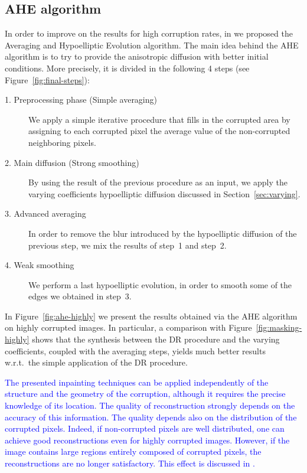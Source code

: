 \documentclass[proc]{edpsmath}
\begin{document}
\subsection{AHE algorithm}

In order to improve on the results for high corruption rates, in \cite{ahe} we proposed the Averaging and Hypoelliptic Evolution algorithm.
The main idea behind the AHE algorithm is to try to provide the anisotropic diffusion with better initial conditions.
More precisely, it is divided in the following 4 steps (see Figure~\ref{fig:final-steps}):
\begin{description}
	\item [1. Preprocessing phase (Simple averaging)] We apply a simple iterative procedure that fills in the corrupted area by assigning to each corrupted pixel the average value of the non-corrupted neighboring pixels.
	\item [2. Main diffusion (Strong smoothing)] By using the result of the previous procedure as an input, we apply the varying coefficients hypoelliptic diffusion discussed in Section~\ref{sec:varying}.
	\item [3. Advanced averaging] In order to remove the blur introduced by the hypoelliptic diffusion of the previous step, we mix the results of step~1 and step~2.
	\item [4. Weak smoothing] We perform a last hypoelliptic evolution, in order to smooth some of the edges we obtained in step~3.
\end{description}

In Figure~\ref{fig:ahe-highly} we present the results obtained via the AHE algorithm on highly corrupted images. In particular, a comparison with Figure~\ref{fig:masking-highly} shows that the synthesis between the DR procedure and the varying coefficients, coupled with the averaging steps, yields much better results w.r.t.\ the simple application of the DR procedure.

\textcolor{blue}{
The presented inpainting techniques can be
applied independently of the structure and the geometry
of the corruption, although it requires the precise
knowledge of its location. The quality of reconstruction
strongly depends on the accuracy of this information.
The quality depends also on the distribution of the corrupted pixels.
Indeed, if non-corrupted pixels are well distributed,
one can achieve good reconstructions even for highly corrupted images.
However, if the image contains large regions entirely composed of corrupted pixels, 
the reconstructions are no longer satisfactory.
This effect is discussed in \cite{ahe}.
}
\end{document}
